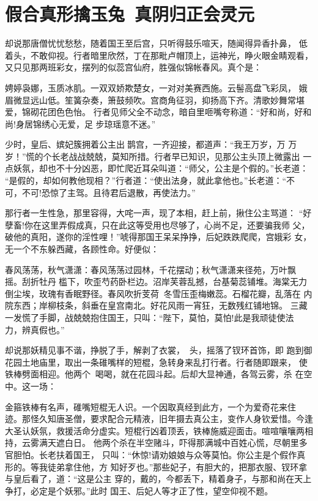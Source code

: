 \chapter{假合真形擒玉兔~真阴归正会灵元}

却说那唐僧忧忧愁愁，随着国王至后宫，只听得鼓乐喧天，随闻得异香扑鼻，
低着头，不敢仰视。行者暗里欣然，丁在那毗卢帽顶上，运神光，睁火眼金睛观看，
又只见那两班彩女，摆列的似蕊宫仙府，胜强似锦帐春风。真个是：

娉婷袅娜，玉质冰肌。一双双娇欺楚女，一对对美赛西施。云髻高盘飞彩凤，
娥眉微显远山低。笙簧杂奏，箫鼓频吹。宫商角征羽，抑扬高下齐。清歌妙舞常堪
爱，锦砌花团色色怡。
行者见师父全不动念，暗自里咂嘴夸称道：“好和尚，好和尚!身居锦绣心无爱，足
步琼瑶意不迷。”

少时，皇后、嫔妃簇拥着公主出鹊宫，一齐迎接，都道声：“我王万岁，万
万岁！”慌的个长老战战兢兢，莫知所措。行者早已知识，见那公主头顶上微露出
一点妖氛，却也不十分凶恶，即忙爬近耳朵叫道：“师父，公主是个假的。”长老道：
“是假的，却如何教他现相？”行者道：“使出法身，就此拿他也。”长老道：“不
可，不可!恐惊了主驾。且待君后退散，再使法力。”

那行者一生性急，那里容得，大咤一声，现了本相，赶上前，揪住公主骂道：
“好孽畜!你在这里弄假成真，只在此这等受用也尽够了，心尚不足，还要骗我师
父，破他的真阳，遂你的淫性哩！”唬得那国王呆呆挣挣，后妃跌跌爬爬，宫娥彩
女，无一个不东躲西藏，各顾性命。好便似：

春风荡荡，秋气潇潇：春风荡荡过园林，千花摆动；秋气潇潇来径苑，万叶飘
摇。刮折牡丹槛下，吹歪芍药卧栏边。沼岸芙蓉乱撼，台基菊蕊铺堆。海棠无力
倒尘埃，玫瑰有香眠野径。春风吹折芰荷，冬雪压歪梅嫩蕊。石榴花瓣，乱落在
内院东西；岸柳枝条，斜垂在皇宫南北。好花风雨一宵狂，无数残红铺地锦。
三藏一发慌了手脚，战兢兢抱住国王，只叫：“陛下，莫怕，莫怕!此是我顽徒使法
力，辨真假也。”

却说那妖精见事不谐，挣脱了手，解剥了衣裳，头，摇落了钗环首饰，即
跑到御花园土地庙里，取出一条碓嘴样的短棍，急转身来乱打行者。行者随即跟来，
使铁棒劈面相迎。他两个喝喝，就在花园斗起。后却大显神通，各驾云雾，杀
在空中。这一场：

金箍铁棒有名声，碓嘴短棍无人识。一个因取真经到此方，一个为爱奇花来住
迹。那怪久知唐圣僧，要求配合元精液，旧年摄去真公主，变作人身钦爱惜。今逢
大圣认妖氛，救援活命分虚实。短棍行凶着顶丢，铁棒施威迎面击。喧喧嚷嚷两相
持，云雾满天遮白日。
他两个杀在半空赌斗，吓得那满城中百姓心慌，尽朝里多官胆怕。长老扶着国王，
只叫：“休惊!请劝娘娘与众等莫怕。你公主是个假作真形的。等我徒弟拿住他，方
知好歹也。”那些妃子，有胆大的，把那衣服、钗环拿与皇后看了，道：“这是公主
穿的，戴的，今都丢下，精着身子，与那和尚在天上争打，必定是个妖邪。”此时
国王、后妃人等才正了性，望空仰视不题。

